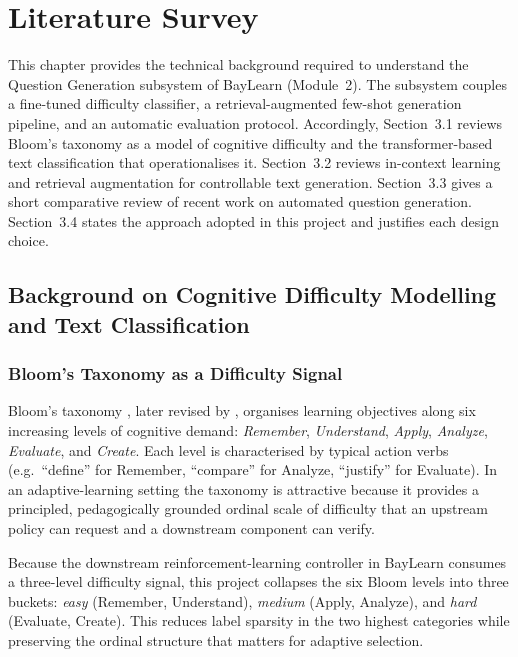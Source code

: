 \documentclass[12pt,a4paper]{report}
\begin{document}
\chapter{Literature Survey}

This chapter provides the technical background required to understand the
Question Generation subsystem of BayLearn (Module~2). The subsystem couples a
fine-tuned difficulty classifier, a retrieval-augmented few-shot generation
pipeline, and an automatic evaluation protocol. Accordingly, Section~3.1 reviews
Bloom's taxonomy as a model of cognitive difficulty and the transformer-based
text classification that operationalises it. Section~3.2 reviews in-context
learning and retrieval augmentation for controllable text generation.
Section~3.3 gives a short comparative review of recent work on automated
question generation. Section~3.4 states the approach adopted in this project and
justifies each design choice.

\section{Background on Cognitive Difficulty Modelling and Text Classification}

\subsection{Bloom's Taxonomy as a Difficulty Signal}
Bloom's taxonomy \parencite{bloom1956taxonomy}, later revised by
\textcite{anderson2001revised}, organises learning objectives along six
increasing levels of cognitive demand: \emph{Remember}, \emph{Understand},
\emph{Apply}, \emph{Analyze}, \emph{Evaluate}, and \emph{Create}. Each level is
characterised by typical action verbs (e.g.\ ``define'' for Remember, ``compare''
for Analyze, ``justify'' for Evaluate). In an adaptive-learning setting the
taxonomy is attractive because it provides a principled, pedagogically grounded
ordinal scale of difficulty that an upstream policy can request and a downstream
component can verify.

Because the downstream reinforcement-learning controller in BayLearn consumes a
three-level difficulty signal, this project collapses the six Bloom levels into
three buckets: \emph{easy} (Remember, Understand), \emph{medium} (Apply,
Analyze), and \emph{hard} (Evaluate, Create). This reduces label sparsity in the
two highest categories while preserving the ordinal structure that matters for
adaptive selection.
\end{document}
